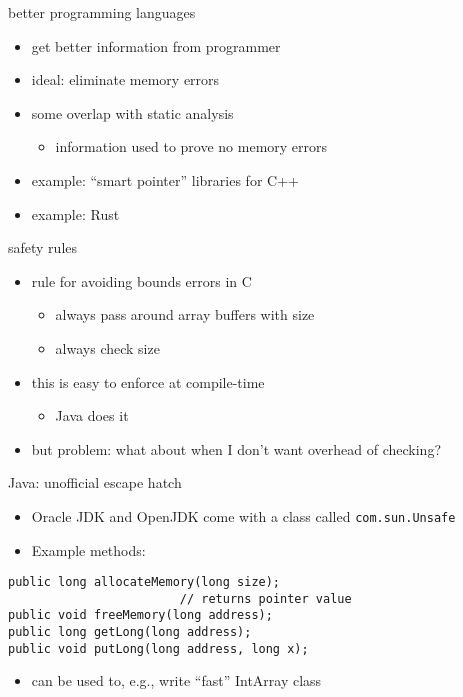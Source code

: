 \begin{frame}{better programming languages}
    \begin{itemize}
        \item get better information from programmer
        \item ideal: eliminate memory errors 
        \item some overlap with static analysis
            \begin{itemize}
                \item information used to prove no memory errors
            \end{itemize}
        \item example: ``smart pointer'' libraries for C++
        \item example: Rust
    \end{itemize}
\end{frame}

\begin{frame}{safety rules}
    \begin{itemize}
    \item rule for avoiding bounds errors in C
        \begin{itemize}
        \item always pass around array buffers with size
        \item always check size
        \end{itemize}
    \item this is easy to enforce at compile-time
        \begin{itemize}
        \item Java does it
        \end{itemize}
    \item but problem: what about when I don't want overhead of checking?
    \end{itemize}
\end{frame}

\begin{frame}[fragile,label=javaEscapeHatch]{Java: unofficial escape hatch}
    \begin{itemize}
    \item Oracle JDK and OpenJDK come with a class called \texttt{com.sun.Unsafe}
    \item Example methods:
    \end{itemize}
\begin{lstlisting}
public long allocateMemory(long size);
                        // returns pointer value
public void freeMemory(long address);
public long getLong(long address);
public void putLong(long address, long x);
\end{lstlisting}
    \begin{itemize}
    \item can be used to, e.g.,  write ``fast'' IntArray class
    \end{itemize}
\end{frame}


